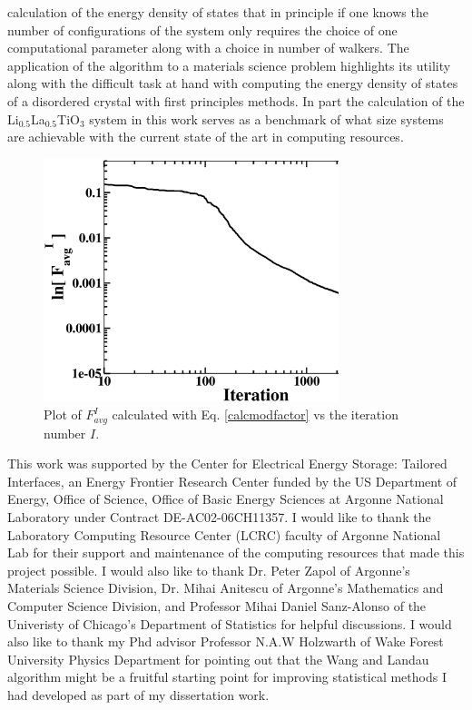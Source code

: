 \documentclass[aps,pre,reprint,superscriptaddress,showkeys]{revtex4-2}
\begin{document}
calculation of the energy density of states that in principle if one knows the number of configurations of the system only requires the choice of one computational parameter along with a choice in number of walkers. The application of the algorithm to a materials science problem highlights its utility along with the difficult task at hand with computing the energy density of states of a disordered crystal with first principles methods. In part the calculation of the Li$_{0.5}$La$_{0.5}$TiO$_{3}$ system in this work serves as a benchmark of what size systems are achievable with the current state of the art in computing resources. 
 
 \begin{figure}[h!]
\includegraphics[width=8.6cm]{fig12.eps}
\caption{Plot of $F_{avg}^I$ calculated with Eq. \ref{calcmodfactor} vs the iteration number $I$.  \label{modfactor_LLTO}}
\end{figure}

\begin{acknowledgments}
This work was supported by the Center for Electrical Energy Storage: Tailored Interfaces, an Energy Frontier Research Center funded 
by the US Department of Energy, Office of Science, Office of Basic Energy Sciences at Argonne National Laboratory under Contract DE-AC02-06CH11357.
I would like to thank the Laboratory Computing Resource Center (LCRC) faculty of Argonne National Lab for their support and maintenance of the computing resources that made this project possible. I would also like to thank Dr. Peter Zapol of Argonne's Materials Science Division, Dr. Mihai Anitescu of Argonne's Mathematics and Computer Science Division, and Professor Mihai Daniel Sanz-Alonso of the Univeristy of Chicago's Department of Statistics for helpful discussions. I would also like to thank my Phd advisor Professor N.A.W Holzwarth of Wake Forest University Physics Department for pointing out that the Wang and Landau algorithm might be a fruitful starting point for improving statistical methods I had developed as part of my dissertation work. 
\end{acknowledgments}
%
%


\end{document}
